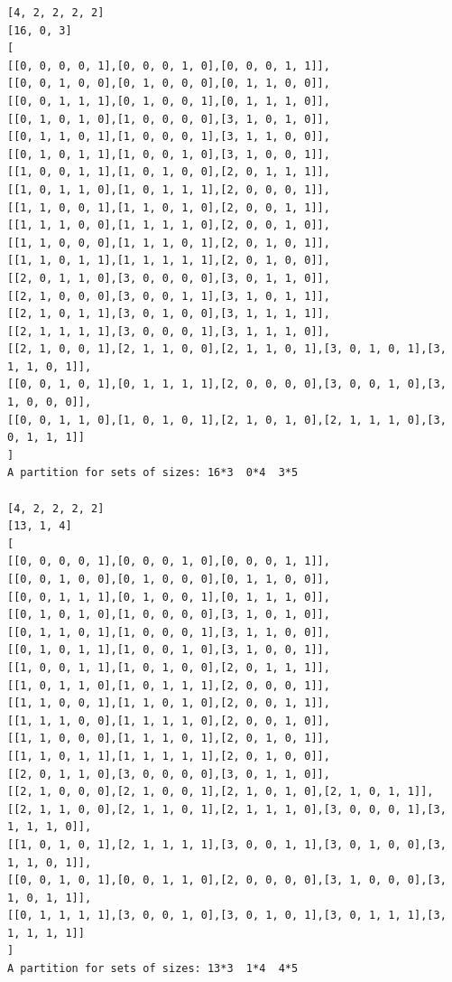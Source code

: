 \documentclass[final]{dmtcs-episciences}
\begin{document}
\begin{appendices}
\newpage

\begin{verbatim}
[4, 2, 2, 2, 2]
[16, 0, 3]
[
[[0, 0, 0, 0, 1],[0, 0, 0, 1, 0],[0, 0, 0, 1, 1]],
[[0, 0, 1, 0, 0],[0, 1, 0, 0, 0],[0, 1, 1, 0, 0]],
[[0, 0, 1, 1, 1],[0, 1, 0, 0, 1],[0, 1, 1, 1, 0]],
[[0, 1, 0, 1, 0],[1, 0, 0, 0, 0],[3, 1, 0, 1, 0]],
[[0, 1, 1, 0, 1],[1, 0, 0, 0, 1],[3, 1, 1, 0, 0]],
[[0, 1, 0, 1, 1],[1, 0, 0, 1, 0],[3, 1, 0, 0, 1]],
[[1, 0, 0, 1, 1],[1, 0, 1, 0, 0],[2, 0, 1, 1, 1]],
[[1, 0, 1, 1, 0],[1, 0, 1, 1, 1],[2, 0, 0, 0, 1]],
[[1, 1, 0, 0, 1],[1, 1, 0, 1, 0],[2, 0, 0, 1, 1]],
[[1, 1, 1, 0, 0],[1, 1, 1, 1, 0],[2, 0, 0, 1, 0]],
[[1, 1, 0, 0, 0],[1, 1, 1, 0, 1],[2, 0, 1, 0, 1]],
[[1, 1, 0, 1, 1],[1, 1, 1, 1, 1],[2, 0, 1, 0, 0]],
[[2, 0, 1, 1, 0],[3, 0, 0, 0, 0],[3, 0, 1, 1, 0]],
[[2, 1, 0, 0, 0],[3, 0, 0, 1, 1],[3, 1, 0, 1, 1]],
[[2, 1, 0, 1, 1],[3, 0, 1, 0, 0],[3, 1, 1, 1, 1]],
[[2, 1, 1, 1, 1],[3, 0, 0, 0, 1],[3, 1, 1, 1, 0]],
[[2, 1, 0, 0, 1],[2, 1, 1, 0, 0],[2, 1, 1, 0, 1],[3, 0, 1, 0, 1],[3, 1, 1, 0, 1]],
[[0, 0, 1, 0, 1],[0, 1, 1, 1, 1],[2, 0, 0, 0, 0],[3, 0, 0, 1, 0],[3, 1, 0, 0, 0]],
[[0, 0, 1, 1, 0],[1, 0, 1, 0, 1],[2, 1, 0, 1, 0],[2, 1, 1, 1, 0],[3, 0, 1, 1, 1]]
]
A partition for sets of sizes: 16*3  0*4  3*5

[4, 2, 2, 2, 2]
[13, 1, 4]
[
[[0, 0, 0, 0, 1],[0, 0, 0, 1, 0],[0, 0, 0, 1, 1]],
[[0, 0, 1, 0, 0],[0, 1, 0, 0, 0],[0, 1, 1, 0, 0]],
[[0, 0, 1, 1, 1],[0, 1, 0, 0, 1],[0, 1, 1, 1, 0]],
[[0, 1, 0, 1, 0],[1, 0, 0, 0, 0],[3, 1, 0, 1, 0]],
[[0, 1, 1, 0, 1],[1, 0, 0, 0, 1],[3, 1, 1, 0, 0]],
[[0, 1, 0, 1, 1],[1, 0, 0, 1, 0],[3, 1, 0, 0, 1]],
[[1, 0, 0, 1, 1],[1, 0, 1, 0, 0],[2, 0, 1, 1, 1]],
[[1, 0, 1, 1, 0],[1, 0, 1, 1, 1],[2, 0, 0, 0, 1]],
[[1, 1, 0, 0, 1],[1, 1, 0, 1, 0],[2, 0, 0, 1, 1]],
[[1, 1, 1, 0, 0],[1, 1, 1, 1, 0],[2, 0, 0, 1, 0]],
[[1, 1, 0, 0, 0],[1, 1, 1, 0, 1],[2, 0, 1, 0, 1]],
[[1, 1, 0, 1, 1],[1, 1, 1, 1, 1],[2, 0, 1, 0, 0]],
[[2, 0, 1, 1, 0],[3, 0, 0, 0, 0],[3, 0, 1, 1, 0]],
[[2, 1, 0, 0, 0],[2, 1, 0, 0, 1],[2, 1, 0, 1, 0],[2, 1, 0, 1, 1]],
[[2, 1, 1, 0, 0],[2, 1, 1, 0, 1],[2, 1, 1, 1, 0],[3, 0, 0, 0, 1],[3, 1, 1, 1, 0]],
[[1, 0, 1, 0, 1],[2, 1, 1, 1, 1],[3, 0, 0, 1, 1],[3, 0, 1, 0, 0],[3, 1, 1, 0, 1]],
[[0, 0, 1, 0, 1],[0, 0, 1, 1, 0],[2, 0, 0, 0, 0],[3, 1, 0, 0, 0],[3, 1, 0, 1, 1]],
[[0, 1, 1, 1, 1],[3, 0, 0, 1, 0],[3, 0, 1, 0, 1],[3, 0, 1, 1, 1],[3, 1, 1, 1, 1]]
]
A partition for sets of sizes: 13*3  1*4  4*5
\end{verbatim}

\newpage


\end{appendices}
\end{document}
